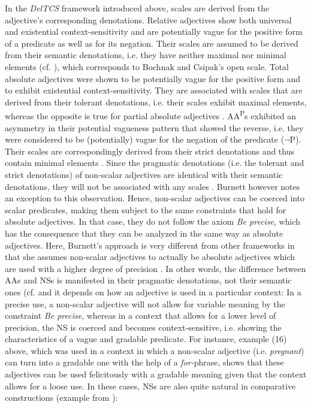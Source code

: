 \documentclass[output=paper]{langsci/langscibook}
\begin{document}
In the \textit{DelTCS} framework introduced above, scales are derived from the adjective's corresponding denotations. Relative adjectives show both universal and existential context-sensitivity and are potentially vague for the positive form of a predicate as well as for its negation. Their scales are assumed to be derived from their semantic denotations, i.e. they have neither maximal nor minimal elements (cf. \citealt[90, 107]{Burnett2017}), which corresponds to Bochnak and Csipak's open scale. Total absolute adjectives were shown to be potentially vague for the positive form and to exhibit existential context-sensitivity. They are associated with scales that are derived from their tolerant denotations, i.e. their scales exhibit maximal elements, whereas the opposite is true for partial absolute adjectives \citeyearpar[90, 106]{Burnett2017}. AA\textsuperscript{P}s exhibited an asymmetry in their potential vagueness pattern that showed the reverse, i.e. they were considered to be (potentially) vague for the negation of the predicate ($\neg$P). Their scales are correspondingly derived from their strict denotations and thus contain minimal elements \citeyearpar[90,106]{Burnett2017}. Since the pragmatic denotations (i.e. the tolerant and strict denotations) of non-scalar adjectives are identical with their semantic denotations, they will not be associated with any scales \citet[90]{Burnett2017}. Burnett however notes an exception to this observation. Hence, non-scalar adjectives can be coerced into scalar predicates, making them subject to the same constraints that hold for absolute adjectives. In that case, they do not follow the axiom \textit{Be precise}, which has the consequence that they can be analyzed in the same way as absolute adjectives. Here, Burnett's approach is very different from other frameworks in that she assumes non-scalar adjectives to actually be absolute adjectives which are used with a higher degree of precision \citeyearpar[97--98]{Burnett2017}. In other words, the difference between AAs and NSs is manifested in their pragmatic denotations, not their semantic ones (cf. \textcite[98]{Burnett2017} and it depends on how an adjective is used in a particular context: In a precise use, a non-scalar adjective will not allow for variable meaning by the constraint \textit{Be precise}, whereas in a context that allows for a lower level of precision, the NS is coerced and becomes context-sensitive, i.e. showing the characteristics of a vague and gradable predicate. For instance, example (16) above, which was used in a context in which a non-scalar adjective (i.e. \textit{pregnant}) can turn into a gradable one with the help of a \textit{for-}phrase, shows that these adjectives can be used felicitously with a gradable meaning given that the context allows for a loose use. In these cases, NSs are also quite natural in comparative constructions (example from \citealt[96]{Burnett2017}):
\end{document}
